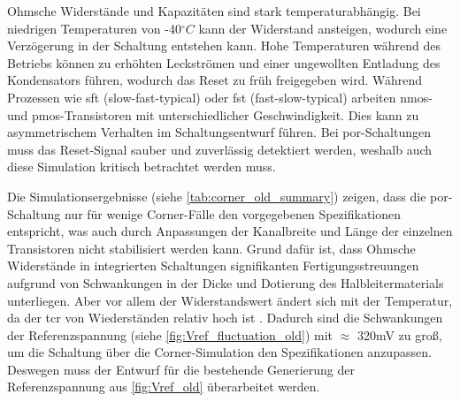 Ohmsche Widerstände und Kapazitäten sind stark temperaturabhängig. Bei niedrigen Temperaturen von -40$^{\circ}C$ kann der Widerstand ansteigen, wodurch eine Verzögerung in der Schaltung entstehen kann. Hohe Temperaturen während des Betriebs können zu erhöhten Leckströmen und einer ungewollten Entladung des Kondensators führen, wodurch das Reset zu früh freigegeben wird. Während Prozessen wie sft (slow-fast-typical) oder fst (fast-slow-typical) arbeiten \gls{nmos}- und \gls{pmos}-Transistoren mit unterschiedlicher Geschwindigkeit. Dies kann zu asymmetrischem Verhalten im Schaltungsentwurf führen. Bei \gls{por}-Schaltungen muss das Reset-Signal sauber und zuverlässig detektiert werden, weshalb auch diese Simulation kritisch betrachtet werden muss.

Die Simulationsergebnisse (siehe \autoref{tab:corner_old_summary}) zeigen, dass die \gls{por}-Schaltung nur für wenige Corner-Fälle den vorgegebenen Spezifikationen entspricht, was auch durch Anpassungen der Kanalbreite und Länge der einzelnen Transistoren nicht stabilisiert werden kann. Grund dafür ist, dass Ohmsche Widerstände in integrierten Schaltungen signifikanten Fertigungsstreuungen aufgrund von Schwankungen in der Dicke und Dotierung des Halbleitermaterials unterliegen. Aber vor allem der Widerstandswert ändert sich mit der Temperatur, da der \gls{tcr} von Wiederständen relativ hoch ist \cite{ADofIntegratedCircuits}. Dadurch sind die Schwankungen der Referenzspannung (siehe \autoref{fig:Vref_fluctuation_old}) mit $\approx$ 320mV zu groß, um die Schaltung über die Corner-Simulation den Spezifikationen anzupassen. Deswegen muss der Entwurf für die bestehende Generierung der Referenzspannung aus \autoref{fig:Vref_old} überarbeitet werden.    



